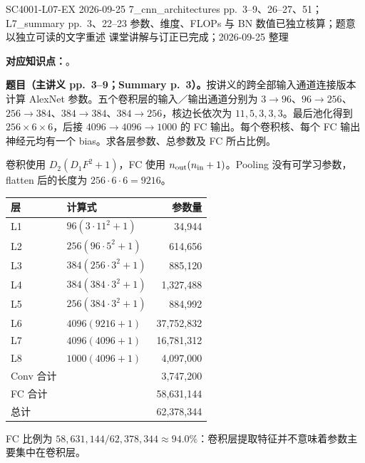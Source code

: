 

\examplemeta
  {SC4001-L07-EX}
  {2026-09-25}
  {7\_cnn\_architectures pp.~3--9、26--27、51；L7\_summary pp.~3、22--23}
  {参数、维度、FLOPs 与 BN 数值已独立核算；题意以独立可读的文字重述}
  {课堂讲解与订正已完成；2026-09-25 整理}


\textbf{对应知识点：}。

\textbf{题目（主讲义 pp.~3--9；Summary p.~3）。}按讲义的跨全部输入通道连接版本计算 AlexNet 参数。五个卷积层的输入／输出通道分别为 $3\to96$、$96\to256$、$256\to384$、$384\to384$、$384\to256$，核边长依次为 $11,5,3,3,3$。最后池化得到 $256\times6\times6$，后接 $4096\to4096\to1000$ 的 FC 输出。每个卷积核、每个 FC 输出神经元均有一个 bias。求各层参数、总参数及 FC 所占比例。

\begin{workedsolution}
卷积使用 $D_2(D_1F^2+1)$，FC 使用 $n_{\rm out}(n_{\rm in}+1)$。Pooling 没有可学习参数，flatten 后的长度为 $256\cdot6\cdot6=9216$。
\begin{center}
\small
\begin{tabular}{@{}llr@{}}
\toprule
层 & 计算式 & 参数量 \\
\midrule
L1 & $96(3\cdot11^2+1)$ & 34,944 \\
L2 & $256(96\cdot5^2+1)$ & 614,656 \\
L3 & $384(256\cdot3^2+1)$ & 885,120 \\
L4 & $384(384\cdot3^2+1)$ & 1,327,488 \\
L5 & $256(384\cdot3^2+1)$ & 884,992 \\
L6 & $4096(9216+1)$ & 37,752,832 \\
L7 & $4096(4096+1)$ & 16,781,312 \\
L8 & $1000(4096+1)$ & 4,097,000 \\
\midrule
Conv 合计 & & 3,747,200 \\
FC 合计 & & 58,631,144 \\
总计 & & 62,378,344 \\
\bottomrule
\end{tabular}
\end{center}
FC 比例为 $58{,}631{,}144/62{,}378{,}344\approx94.0\%$：卷积层提取特征并不意味着参数主要集中在卷积层。
\end{workedsolution}


